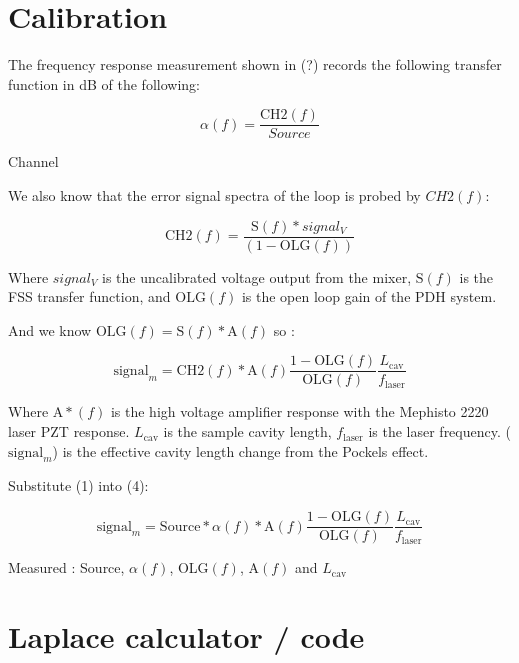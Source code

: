 
\section{Calibration}
The frequency response measurement shown in (?) records the following transfer function in dB of the following:

\begin{equation}
\alpha(f) = \frac{\mathrm{CH2}(f)}{Source}
\end{equation}

Channel

We also know that the error signal spectra of the loop is probed by $CH2(f)$:


\begin{equation}
\mathrm{CH2}(f) = \frac{\mathrm{S}(f)*signal_V}{(1-\mathrm{OLG}(f))}
\end{equation}

Where $signal_V$ is the uncalibrated voltage output from the mixer, $\mathrm{S}(f)$ is the FSS transfer function, and $\mathrm{OLG}(f)$ is the open loop gain of the PDH system.

And we know $\mathrm{OLG}(f) = \mathrm{S}(f)*\mathrm{A}(f)$ so :

\begin{equation}
\mathrm{signal}_m = \mathrm{CH2}(f)*\mathrm{A}(f) \frac{1-\mathrm{OLG}(f)}{\mathrm{OLG}(f)} \frac{L_\mathrm{cav}}{f_\mathrm{laser}}
\end{equation}

Where $\mathrm{A}*(f)$ is the high voltage amplifier response with the Mephisto 2220 laser PZT response. $L_\mathrm{cav}$ is the sample cavity length, $f_\mathrm{laser}$ is the laser frequency. ($\mathrm{signal}_m$)  is the effective cavity length change from the Pockels effect.

Substitute (1) into (4):

\begin{equation}
\mathrm{signal}_m = \mathrm{Source} * \alpha(f) * \mathrm{A}(f) \frac{1-\mathrm{OLG}(f)}{\mathrm{OLG}(f)} \frac{L_\mathrm{cav}}{f_\mathrm{laser}}
\end{equation}

Measured :
Source, $\alpha (f)$, OLG$(f)$, A$(f)$ and $L_\mathrm{cav}$

\section{Laplace calculator / code}

